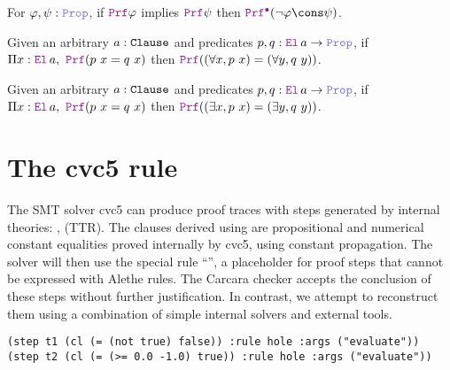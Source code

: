 \begin{lemma}[$\kw{subproof}_1$]\label{lem:subproof}
For $\varphi, \psi : \prop{}$, if $\prf{} \varphi$ implies $\prf{} \psi$ then $\pid (\neg \varphi \cons \psi)$.
\end{lemma}


\begin{lemma}\label{lem:bind-forall}
Given an arbitrary $a : \texttt{\upshape{Clause}}$ and predicates $p, q : \el{}\,a \ra \prop$, if $\Pi x : \el{}\,a,~ \prf (p~x = q~x)$ then $\prf ((\forall x, p~x) = (\forall y, q~y))$.
\end{lemma}


\begin{lemma}\label{lem:bind-exists}
  Given an arbitrary $a : \texttt{\upshape{Clause}}$ and predicates $p, q : \el{}\,a \ra \prop$, if $\Pi x : \el{}\,a,~ \prf (p~x = q~x)$ then $\prf ((\exists x, p~x) = (\exists y, q~y))$.
\end{lemma}

\section{The \texttt{} cvc5 rule}
\label{ssec:eval-recon}

The SMT solver cvc5 can produce proof traces with steps generated by internal theories: ,  (TTR).
The clauses derived using  are propositional and numerical constant equalities proved internally by cvc5, using constant propagation.
The solver will then use the special rule ``'', a placeholder for proof steps that cannot be expressed with Alethe rules.
The Carcara checker accepts the conclusion of these  steps without further justification.
In contrast, we attempt to reconstruct them using a combination of simple internal solvers and external tools.

\smallskip

\begin{lstlisting}[language=SMT,caption={An example of proof trace using the cvc5 $\kw{evaluate}$ rule.},label={lst:eval-step}]
(step t1 (cl (= (not true) false)) :rule hole :args ("evaluate"))
(step t2 (cl (= (>= 0.0 -1.0) true)) :rule hole :args ("evaluate"))
\end{lstlisting}

\smallskip

